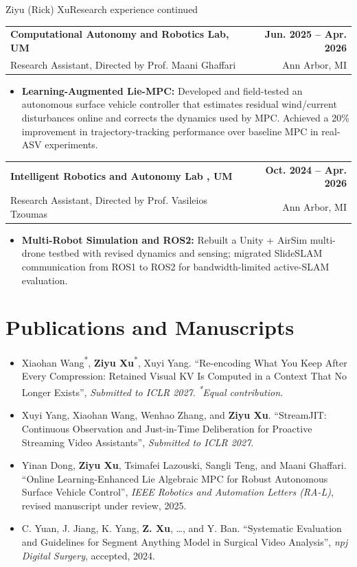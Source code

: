 \documentclass[11pt,letterpaper]{article}
\makeatletter
\newcommand{\resumeSubheading}[4]{
    \begin{tabularx}{\textwidth}{@{}Xr@{}}
        \textbf{#1} & \textbf{#2} \\
        #3 & #4 \\
    \end{tabularx}
}
\newcommand{\resumeItem}[1]{
    \item #1
}
\makeatother
\begin{document}
\newpage
{\small Ziyu (Rick) Xu}\hfill{\small Research experience continued}
\vspace{4pt}
\resumeSubheading
{Computational Autonomy and Robotics Lab, UM }
{Jun. 2025 -- Apr. 2026}
{\hspace*{1.4em}Research Assistant, Directed by Prof. Maani Ghaffari}
{Ann Arbor, MI}
\begin{itemize}[leftmargin=2.4em, itemsep=0.5pt, topsep=0pt]
\small
\resumeItem{\textbf{Learning-Augmented Lie-MPC:} Developed and field-tested an autonomous surface vehicle controller that estimates residual wind/current disturbances online and corrects the dynamics used by MPC. Achieved a 20\% improvement in trajectory-tracking performance over baseline MPC in real-ASV experiments.}
\end{itemize}

\resumeSubheading
{Intelligent Robotics and Autonomy Lab , UM}
{Oct. 2024 -- Apr. 2026}
{\hspace*{1.4em}Research Assistant, Directed by Prof. Vasileios Tzoumas}
{Ann Arbor, MI}
\begin{itemize}[leftmargin=2.4em, itemsep=0.5pt, topsep=0pt]
\small
\resumeItem{\textbf{Multi-Robot Simulation and ROS2:} Rebuilt a Unity + AirSim multi-drone testbed with revised dynamics and sensing; migrated SlideSLAM communication from ROS1 to ROS2 for bandwidth-limited active-SLAM evaluation.}
\end{itemize}

\section*{Publications and Manuscripts}
\begin{itemize}[leftmargin=1.4em,itemsep=3pt,topsep=2pt]
\small
\item Xiaohan Wang\textsuperscript{*}, \textbf{Ziyu Xu}\textsuperscript{*}, Xuyi Yang.      ``Re-encoding What You Keep After Every Compression: Retained Visual KV Is Computed in a Context That No Longer Exists'',      \textit{Submitted to ICLR 2027}. \textit{\textsuperscript{*}Equal contribution.}
\item Xuyi Yang, Xiaohan Wang, Wenhao Zhang, and \textbf{Ziyu Xu}.      ``StreamJIT: Continuous Observation and Just-in-Time Deliberation for Proactive Streaming Video Assistants'',      \textit{Submitted to ICLR 2027}.
\item Yinan Dong, \textbf{Ziyu Xu}, Tsimafei Lazouski, Sangli Teng, and Maani Ghaffari.      ``Online Learning-Enhanced Lie Algebraic MPC for Robust Autonomous Surface Vehicle Control'',      \textit{IEEE Robotics and Automation Letters (RA-L)}, revised manuscript under review, 2025.
\item C. Yuan, J. Jiang, K. Yang, \textbf{Z. Xu}, \ldots, and Y. Ban.      ``Systematic Evaluation and Guidelines for Segment Anything Model in Surgical Video Analysis'',      \textit{npj Digital Surgery}, accepted, 2024.
\end{itemize}
\end{document}
